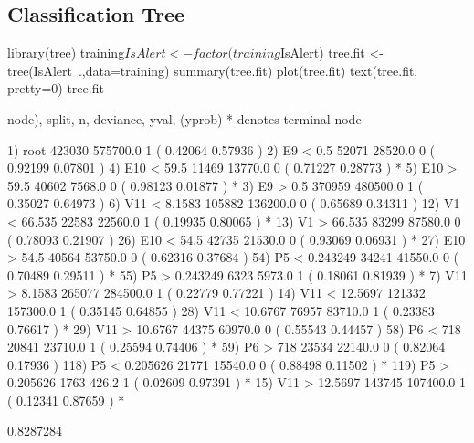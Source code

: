 \documentclass[11pt]{article}
\begin{document}
\subsection{Classification Tree}
\begin{Schunk}
\begin{Sinput}
library(tree)
training$IsAlert <- factor(training$IsAlert)
tree.fit <- tree(IsAlert~.,data=training)
summary(tree.fit)
plot(tree.fit)
text(tree.fit, pretty=0)
tree.fit
\end{Sinput}
\begin{Soutput}
node), split, n, deviance, yval, (yprob)
      * denotes terminal node

  1) root 423030 575700.0 1 ( 0.42064 0.57936 )  
    2) E9 < 0.5 52071  28520.0 0 ( 0.92199 0.07801 )  
      4) E10 < 59.5 11469  13770.0 0 ( 0.71227 0.28773 ) *
      5) E10 > 59.5 40602   7568.0 0 ( 0.98123 0.01877 ) *
    3) E9 > 0.5 370959 480500.0 1 ( 0.35027 0.64973 )  
      6) V11 < 8.1583 105882 136200.0 0 ( 0.65689 0.34311 )  
       12) V1 < 66.535 22583  22560.0 1 ( 0.19935 0.80065 ) *
       13) V1 > 66.535 83299  87580.0 0 ( 0.78093 0.21907 )  
         26) E10 < 54.5 42735  21530.0 0 ( 0.93069 0.06931 ) *
         27) E10 > 54.5 40564  53750.0 0 ( 0.62316 0.37684 )  
           54) P5 < 0.243249 34241  41550.0 0 ( 0.70489 0.29511 ) *
           55) P5 > 0.243249 6323   5973.0 1 ( 0.18061 0.81939 ) *
      7) V11 > 8.1583 265077 284500.0 1 ( 0.22779 0.77221 )  
       14) V11 < 12.5697 121332 157300.0 1 ( 0.35145 0.64855 )  
         28) V11 < 10.6767 76957  83710.0 1 ( 0.23383 0.76617 ) *
         29) V11 > 10.6767 44375  60970.0 0 ( 0.55543 0.44457 )  
           58) P6 < 718 20841  23710.0 1 ( 0.25594 0.74406 ) *
           59) P6 > 718 23534  22140.0 0 ( 0.82064 0.17936 )  
            118) P5 < 0.205626 21771  15540.0 0 ( 0.88498 0.11502 ) *
            119) P5 > 0.205626 1763    426.2 1 ( 0.02609 0.97391 ) *
       15) V11 > 12.5697 143745 107400.0 1 ( 0.12341 0.87659 ) *
\end{Soutput}
\begin{Soutput}
[1] 0.8287284
\end{Soutput}
\end{Schunk}
\end{document}
